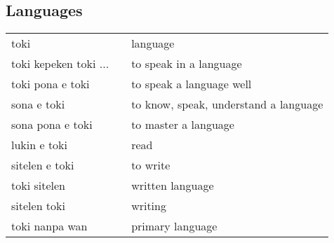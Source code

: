 \subsection{Languages}
%
\begin{supertabular}{p{4,5cm}|ll}
    toki                  &  & language                              \\
    toki kepeken toki ... &  & to speak in a language                \\
    toki pona e toki      &  & to speak a language well              \\
    sona e toki           &  & to know, speak, understand a language \\
    sona pona e toki      &  & to master a language                  \\
    lukin e toki          &  & read                                  \\
    sitelen e toki        &  & to write                              \\
    toki sitelen          &  & written language                      \\
    sitelen toki          &  & writing                               \\
    toki nanpa wan        &  & primary language                      \\
\end{supertabular} \\
%
%

